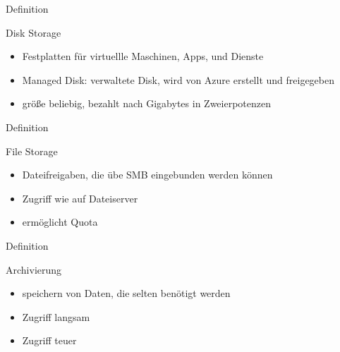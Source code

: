 \documentclass{scrartcl}
\newenvironment{flashcard}[2][]{%
    #1
    \vfill
    \centerline{\Large{#2}}
    \vfill
\newpage
}
{\newpage}
\begin{document}
    \begin{flashcard}[Definition]{Disk Storage}
        \begin{itemize}
            \item Festplatten für virtuellle Maschinen, Apps, und Dienste
            \item Managed Disk: verwaltete Disk, wird von Azure erstellt und freigegeben
            \item größe beliebig, bezahlt nach Gigabytes in Zweierpotenzen
        \end{itemize}
    \end{flashcard}

    \begin{flashcard}[Definition]{File Storage}
        \begin{itemize}
            \item Dateifreigaben, die übe SMB eingebunden werden können
            \item Zugriff wie auf Dateiserver
            \item ermöglicht Quota
        \end{itemize}
    \end{flashcard}

    \begin{flashcard}[Definition]{Archivierung}
        \begin{itemize}
            \item speichern von Daten, die selten benötigt werden
            \item Zugriff langsam
            \item Zugriff teuer
        \end{itemize}
    \end{flashcard}
\end{document}
